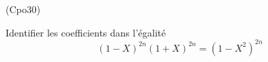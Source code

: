 \begin{tiny}(Cpo30)\end{tiny} Identifier les coefficients dans l'égalité 
\begin{displaymath}
 (1-X)^{2n}(1+X)^{2n}=(1-X^2)^{2n}
\end{displaymath}
